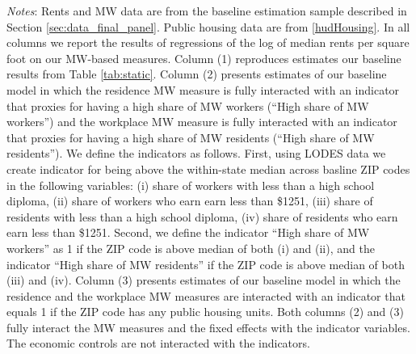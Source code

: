 \begin{table}[hbt!]
    \begin{minipage}{.95\textwidth} \footnotesize
        \vspace{2mm}
        \textit{Notes}: 
        Rents and MW data are from the baseline estimation sample described in Section 
        \ref{sec:data_final_panel}.
        Public housing data are from \ref{hudHousing}.
        In all columns we report the results of regressions of the log of median rents 
        per square foot on our MW-based measures.
        Column (1) reproduces estimates our baseline results from Table \ref{tab:static}.
        Column (2) presents estimates of our baseline model in which the residence MW 
        measure is fully interacted with an indicator that proxies for having a high share 
        of MW workers (``High share of MW workers'') and the workplace MW measure is 
        fully interacted with an indicator that proxies for having a high share of MW 
        residents (``High share of MW residents'').
        We define the indicators as follows.
        First, using LODES data we create indicator for being above the within-state 
        median across basline ZIP codes in the following variables: (i) share of workers 
        with less than a high school diploma, (ii) share of workers who earn earn less 
        than \$1251, (iii) share of residents with less than a high school diploma, (iv) 
        share of residents who earn earn less than \$1251.
        Second, we define the indicator ``High share of MW workers'' as 1 if the ZIP
        code is above median of both (i) and (ii), and the indicator ``High share of MW 
        residents'' if the ZIP code is above median of both (iii) and (iv).
        Column (3) presents estimates of our baseline model in which the residence and 
        the workplace MW measures are interacted with an indicator that equals 1 if 
        the ZIP code has any public housing units.
        Both columns (2) and (3) fully interact the MW measures and the fixed effects
        with the indicator variables.
        The economic controls are not interacted with the indicators.
    \end{minipage}
\end{table}
